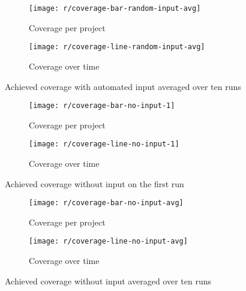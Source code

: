 \begin{figure}[htpb]
    \centering
    \begin{subfigure}{.95\textwidth}
        \texttt{[image: r/coverage-bar-random-input-avg]}
        \caption{Coverage per project}
        \label{fig:coverage_bar_avg}
    \end{subfigure}

    \bigskip

    \begin{subfigure}{.95\textwidth}
        \texttt{[image: r/coverage-line-random-input-avg]}
        \caption{Coverage over time}
        \label{fig:coverage_line_avg}
    \end{subfigure}

    \caption{Achieved coverage with automated input averaged over ten runs}
    \label{fig:coverage_avg}
\end{figure}

\begin{figure}[htpb]
    \centering
    \begin{subfigure}{.95\textwidth}
        \texttt{[image: r/coverage-bar-no-input-1]}
        \caption{Coverage per project}
        \label{fig:coverage_no_input_bar}
    \end{subfigure}

    \bigskip

    \begin{subfigure}{.95\textwidth}
        \texttt{[image: r/coverage-line-no-input-1]}
        \caption{Coverage over time}
        \label{fig:coverage_no_input_line}
    \end{subfigure}

    \caption{Achieved coverage without input on the first run}
    \label{fig:coverage_no_input}
\end{figure}

\begin{figure}[htpb]
    \centering
    \begin{subfigure}{.95\textwidth}
        \texttt{[image: r/coverage-bar-no-input-avg]}
        \caption{Coverage per project}
        \label{fig:coverage_no_input_bar_avg}
    \end{subfigure}

    \bigskip

    \begin{subfigure}{.95\textwidth}
        \texttt{[image: r/coverage-line-no-input-avg]}
        \caption{Coverage over time}
        \label{fig:coverage_no_input_line_avg}
    \end{subfigure}

    \caption{Achieved coverage without input averaged over ten runs}
    \label{fig:coverage_no_input_avg}
\end{figure}

